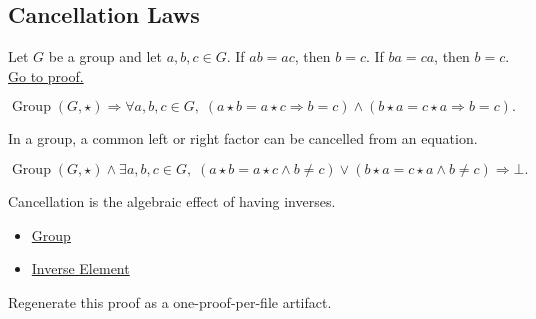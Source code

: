 \subsection*{Cancellation Laws}
\label{subsec:cancellation-laws}

\begin{proposition}
\label{prop:group-cancellation}
Let $G$ be a group and let $a,b,c \in G$.
If $ab = ac$, then $b=c$.
If $ba = ca$, then $b=c$.
\hyperref[prf:group-cancellation]{Go to proof.}
\end{proposition}

\begin{remark*}
\[
\operatorname{Group}(G,\star)
\Longrightarrow
\forall a,b,c\in G,\;
(a\star b=a\star c \Rightarrow b=c)
\land
(b\star a=c\star a \Rightarrow b=c).
\]
\end{remark*}

\begin{remark*}
In a group, a common left or right factor can be cancelled from an equation.
\end{remark*}

\begin{remark*}
\[
\operatorname{Group}(G,\star)
\land
\exists a,b,c\in G,\;
(a\star b=a\star c \land b\neq c)
\lor
(b\star a=c\star a \land b\neq c)
\Longrightarrow \bot.
\]
\end{remark*}

\begin{remark*}[Interpretation]
Cancellation is the algebraic effect of having inverses.
\end{remark*}

\begin{dependencies}
\begin{itemize}
  \item \hyperref[def:algebraic-group]{Group}
  \item \hyperref[def:inverse-element]{Inverse Element}
\end{itemize}
\end{dependencies}

\begin{remark*}
Regenerate this proof as a one-proof-per-file artifact.
\end{remark*}
